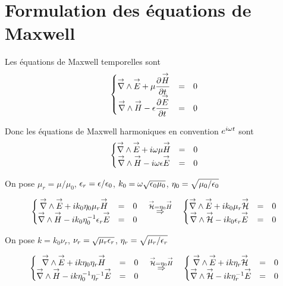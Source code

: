 \section{Formulation des équations de Maxwell}
\label{sec:annex:maxwell_equation}

Les équations de Maxwell temporelles sont
\begin{equation}
  \left\lbrace \begin{matrix}
  \vrot \vE + \mu \ddr{t}{\vect{H}} &=& 0 \\
  \vrot \vect{H} - \eps \ddr{t}{\vE} &=& 0 \\
  \end{matrix} \right.
\end{equation}

Donc les équations de Maxwell harmoniques en convention \(e^{i\w t}\) sont
\begin{equation}
  \left\lbrace \begin{matrix}
  \vrot \vE + i\w\mu \vect{H} &=& 0 \\
  \vrot \vect{H} - i\w\eps \vE &=& 0 \\
  \end{matrix} \right.
\end{equation}

On pose \(\mu_r = \mu \slash \mu_0\), \(\eps_r = \eps \slash \eps_0\), \(k_0 = \w \sqrt {\eps_0\mu_0}\), \(\eta_0=\sqrt {\mu_0/\eps_0}\)

\begin{equation}
\left\lbrace \begin{matrix}
\vrot \vE + ik_0\eta_0\mu_r \vect{H} &=& 0 \\
\vrot \vect{H} - ik_0\eta_0^{-1}\eps_r \vE &=& 0 \\
\end{matrix} \right.
\quad
\overset{\vH = \eta_0 \vect{H}}{\Rightarrow}
\quad
\left\lbrace \begin{matrix}
\vrot \vE + ik_0\mu_r \vH &=& 0 \\
\vrot \vH - ik_0\eps_r \vE &=& 0 \\
\end{matrix} \right.
\end{equation}

On pose \(k=k_0\nu_r\), \(\nu_r = \sqrt{\mu_r\eps_r}\), \(\eta_r = \sqrt{\mu_r \slash \eps_r}\)

\begin{equation}
\left\lbrace \begin{matrix}
\vrot \vE + ik\eta_0\eta_r \vect{H} &=& 0 \\
\vrot \vect{H} - ik\eta_0^{-1}\eta_r^{-1} \vE &=& 0 \\
\end{matrix} \right.
\quad
\overset{\vH = \eta_0 \vect{H}}{\Rightarrow}
\quad
\left\lbrace \begin{matrix}
\vrot \vE + ik\eta_r \vH &=& 0 \\
\vrot \vH - ik\eta_r^{-1} \vE &=& 0 \\
\end{matrix} \right.
\end{equation}